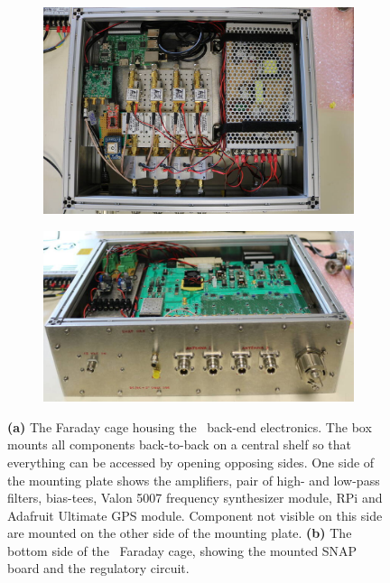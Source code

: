 \begin{figure}
	\centering
	\begin{subfigure}[t]{0.52\textwidth}
		\centering
		\includegraphics[width=\linewidth]{Figures/47093126504_fa0061a85b_o} 
		\caption{} \label{Fig:47093126504_fa0061a85b_o}
	\end{subfigure}
	\hfill
	\begin{subfigure}[t]{0.47\textwidth}
		\centering
		\includegraphics[width=\linewidth]{Figures/47093128324_04792aa5c5_o}
		\caption{} \label{Fig:47093128324_04792aa5c5_o}
	\end{subfigure}
	\caption{{\bf (a)} The Faraday cage housing the \albatros\ back-end electronics. The box mounts all components back-to-back on a central shelf so that everything can be accessed by opening opposing sides. One side of the mounting plate shows the amplifiers, pair of high- and low-pass filters, bias-tees, Valon 5007 frequency synthesizer module, RPi and Adafruit Ultimate GPS module. Component not visible on this side are mounted on the other side of the mounting plate. {\bf (b)} The bottom side of the \albatros\ Faraday cage, showing the mounted SNAP board and the regulatory circuit.} \label{Fig:faraday1}
\end{figure}


